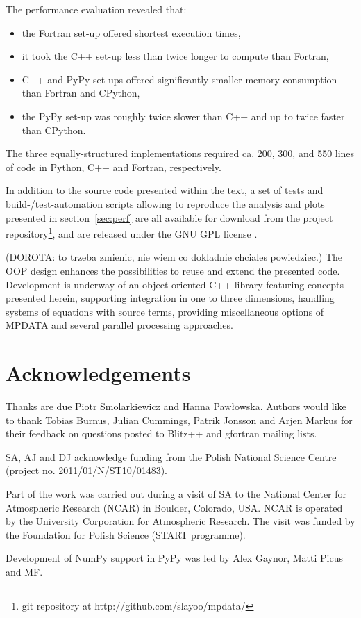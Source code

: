 \documentclass[final,5p,times,twocolumn]{elsarticle}
\newcommand{\url}[1]{{#1}}
\begin{document}
    
  The performance evaluation revealed that:
    \begin{itemize}
      \item{the Fortran set-up offered shortest execution times,}
      \item{it took the C++ set-up less than twice longer to compute than Fortran,}
      \item{C++ and PyPy set-ups offered significantly smaller memory consumption 
        than Fortran and CPython,}
      \item{the PyPy set-up was roughly twice slower than C++ and up to twice faster than CPython.}
    \end{itemize}
  The three equally-structured implementations required ca. 200, 300, and 550 lines of code %
    in Python, C++ and Fortran, respectively.  

  In addition to the source code presented within the text,
    a set of tests and build-/test-automation scripts
    allowing to reproduce the analysis and plots presented in section~\ref{sec:perf} are all 
    available for download from the project repository\footnote{git repository at \url{http://github.com/slayoo/mpdata/}},
    and are released under the GNU GPL license \citep{GPLv3}.

(DOROTA: to trzeba zmienic, nie wiem co dokladnie chciales powiedziec.)
  The OOP design enhances the possibilities to reuse and extend the presented code.
  Development is underway of an object-oriented C++ library featuring concepts presented herein,
    supporting integration in one to three dimensions, handling systems of equations with source terms, 
    providing miscellaneous options of MPDATA and several parallel processing approaches.

  \section*{Acknowledgements}
  {\small
    \noindent 
    Thanks are due Piotr Smolarkiewicz and Hanna Pawłowska.
    \noindent
    Authors would like to thank Tobias Burnus, Julian Cummings, Patrik Jonsson and
      Arjen Markus for their feedback on questions posted to Blitz++ and gfortran
      mailing lists.
    
    \noindent
    SA, AJ and DJ acknowledge funding from the Polish National Science Centre
      (project no. 2011/01/N/ST10/01483).

    \noindent
    Part of the work was carried out during a visit of SA to the National
      Center for Atmospheric Research (NCAR) in Boulder, Colorado, USA.
    NCAR is operated by the University Corporation for Atmospheric Research.
    The visit was funded by the Foundation for Polish Science (START programme).
 
    \noindent
    Development of NumPy support in PyPy was led by Alex Gaynor, Matti Picus and MF.
  }
\end{document}
